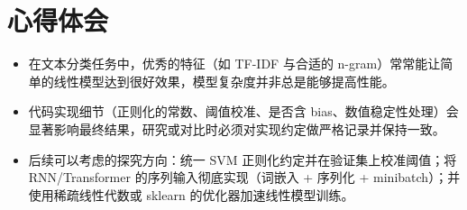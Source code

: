 \section{心得体会}

\begin{itemize}
    \item 在文本分类任务中，优秀的特征（如 TF-IDF 与合适的 n-gram）常常能让简单的线性模型达到很好效果，模型复杂度并非总是能够提高性能。
    \item 代码实现细节（正则化的常数、阈值校准、是否含 bias、数值稳定性处理）会显著影响最终结果，研究或对比时必须对实现约定做严格记录并保持一致。
    \item 后续可以考虑的探究方向：统一 SVM 正则化约定并在验证集上校准阈值；将 RNN/Transformer 的序列输入彻底实现（词嵌入 + 序列化 + minibatch）；并使用稀疏线性代数或 sklearn 的优化器加速线性模型训练。
\end{itemize}

